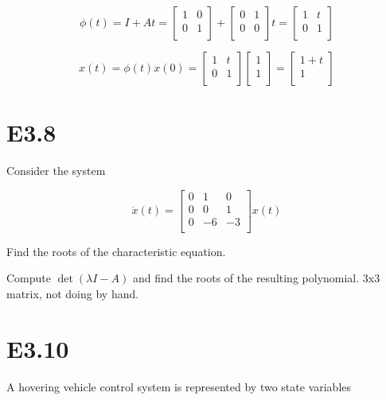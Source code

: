 \documentclass[11pt]{article}
\begin{document}
\[ \phi(t) = I + At = 
\begin{bmatrix}
    1 & 0 \\
    0 & 1 \\
\end{bmatrix}
+
\begin{bmatrix}
    0 & 1 \\
    0 & 0 \\
\end{bmatrix}
t
= \begin{bmatrix}
    1 & t \\
    0 & 1 \\
\end{bmatrix}
\]

\[
x(t) = \phi(t) x(0) =
\begin{bmatrix}
    1 & t \\
    0 & 1 \\
\end{bmatrix}
\begin{bmatrix}
    1 \\
    1 \\
\end{bmatrix}
=
\begin{bmatrix}
    1 + t \\
    1 \\
\end{bmatrix}
\]

\section{E3.8}

Consider the system

\[
\dot x(t) =
\begin{bmatrix}
    0 & 1 & 0 \\
    0 & 0 & 1 \\
    0 & -6 & -3 \\
\end{bmatrix}
x(t)
\]

Find the roots of the characteristic equation.

Compute $\det (\lambda I - A)$ and find the roots of the resulting polynomial. 3x3 matrix, not doing by hand.

\section{E3.10}

A hovering vehicle control system is represented by two state variables
\end{document}
